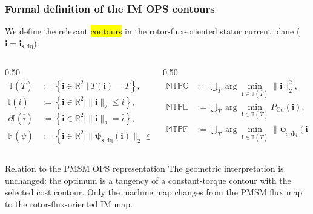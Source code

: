 \begin{frame}
    \frametitle{Formal definition of the IM OPS contours}
    We define the relevant \hl{contours} in the rotor-flux-oriented stator current plane ($\bm{i}=\bm{i}_{\mathrm{s,dq}}$):
    \vspace{-0.2cm}
    \begin{columns}[c,onlytextwidth]
        \begin{column}{0.50\textwidth}
            \begin{align*}
                \mathbb{T}(\bar T)
                 & :=\left\{\bm{i}\in\mathbb{R}^2\mid T(\bm{i})=\bar T\right\},       \\
                \mathbb{I}(\bar i)
                 & :=\left\{\bm{i}\in\mathbb{R}^2\mid \|\bm{i}\|_2\le \bar i\right\}, \\
                \partial\mathbb{I}(\bar i)
                 & :=\left\{\bm{i}\in\mathbb{R}^2\mid \|\bm{i}\|_2=\bar i\right\},    \\
                \mathbb{F}(\bar\psi)
                 & :=\left\{\bm{i}\in\mathbb{R}^2\mid
                \|\bm{\psi}_{\mathrm{s,dq}}(\bm{i})\|_2\le\bar\psi\right\}.
            \end{align*}
        \end{column}\pause%
        \begin{column}{0.50\textwidth}
            \begin{align*}
                \mathbb{MTPC}
                 & :={\bigcup}_{\bar T}\arg\min_{\bm{i}\in\mathbb{T}(\bar T)}\|\bm{i}\|_2^2,          \\
                \mathbb{MTPL}
                 & :={\bigcup}_{\bar T}\arg\min_{\bm{i}\in\mathbb{T}(\bar T)}P_{\mathrm{Cu}}(\bm{i}), \\
                \mathbb{MTPF}
                 & :={\bigcup}_{\bar T}\arg\min_{\bm{i}\in\mathbb{T}(\bar T)}
                \|\bm{\psi}_{\mathrm{s,dq}}(\bm{i})\|_2^2 .
            \end{align*}
        \end{column}
    \end{columns}\pause%
    \begin{varblock}{Relation to the PMSM OPS representation}
        The geometric interpretation is unchanged: the optimum is a tangency of a constant-torque contour with the selected cost contour. Only the machine map changes from the PMSM flux map to the rotor-flux-oriented IM map.
    \end{varblock}
\end{frame}

